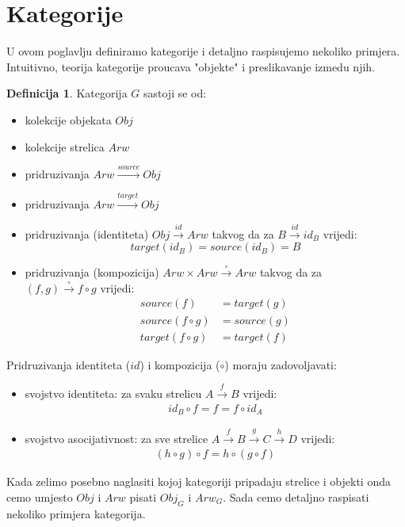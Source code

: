\documentclass[11pt]{article}
\theoremstyle{definition}
\newtheorem{definition}{Definicija}
\begin{document}
  \section{Kategorije}
  U ovom poglavlju definiramo kategorije i detaljno raspisujemo nekoliko
  primjera.
  Intuitivno, teorija kategorije proucava "objekte" i preslikavanje izmedu njih.
  \begin{definition}
    Kategorija $G$ sastoji se od:
    \begin{itemize}
      \item kolekcije objekata $Obj$
      \item kolekcije strelica $Arw$
      \item pridruzivanja $Arw \xrightarrow{source} Obj$
      \item pridruzivanja $Arw \xrightarrow{target} Obj$
      \item pridruzivanja (identiteta) $Obj \xrightarrow{id} Arw$ takvog da
      za $B \xrightarrow{id} id_B$ vrijedi:
        \begin{equation}
          target(id_B) = source(id_B) = B
        \end{equation}
      \item pridruzivanja (kompozicija) $Arw \times Arw \xrightarrow{\circ}
      Arw$ takvog da za \\ $(f, g) \xrightarrow{\circ} f \circ g$ vrijedi:
        \begin{align}
          source(f) &= target(g) \\
          source(f \circ g) &= source(g) \\
          target(f \circ g) &= target(f)
        \end{align}
    \end{itemize}
    Pridruzivanja identiteta ($id$) i kompozicija ($\circ$) moraju
    zadovoljavati:
    \begin{itemize}
      \item svojstvo identiteta: za svaku strelicu $A \xrightarrow{f} B$ vrijedi:
        \begin{align}
          id_B \circ f = f = f \circ id_A
        \end{align}
      \item svojstvo asocijativnost: za sve strelice $A \xrightarrow{f} B
      \xrightarrow{g} C \xrightarrow{h} D$ vrijedi:
        \begin{align}
          (h \circ g) \circ f = h \circ (g \circ f)
        \end{align}
    \end{itemize}
  \end{definition}
  Kada zelimo posebno naglasiti kojoj kategoriji pripadaju strelice i objekti
  onda cemo umjesto $Obj$ i $Arw$ pisati $Obj_G$ i $Arw_G$.
  Sada cemo detaljno raspisati nekoliko primjera kategorija.
\end{document}
